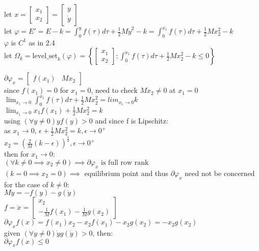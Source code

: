 \documentclass[12pt,letter]{article}
\begin{document}
\begin{itemize}
    let $x=\begin{bmatrix}x_1 \\ x_2 \end{bmatrix}=\begin{bmatrix}y \\ \dot{y} \end{bmatrix}$\\

    let $\varphi=E'=E-k=\int_{0}^y f(\tau) d \tau + \frac{1}{2}M \dot{y}^2-k=\int_{0}^{x_1} f(\tau) d \tau + \frac{1}{2}M x_2^2-k$\\

    $\varphi$ is $C^1$ as in 2.4\\
    
    let $\Omega_k = \text{level\_set}_{k}(\varphi) = \left\{\begin{bmatrix}x_1 \\ x_2\end{bmatrix}: \int_{0}^{x_1} f(\tau) d \tau + \frac{1}{2}M x_2^2-k \leq 0 \right\}$

    $\partial \varphi_x = \begin{bmatrix} f(x_1) & M x_2\end{bmatrix}$\\

    since $f(x_1)=0$  for $x_1=0$, need to check $Mx_2 \neq 0$ at $x_1=0$\\
    $\lim_{x_1\rightarrow 0} \int_{0}^{x_1} f(\tau) d \tau + \frac{1}{2}M x_2^2=lim_{x_1\rightarrow 0}k$\\
    $\lim_{x_1\rightarrow 0}x_1 f(x_1) + \frac{1}{2}M x_2^2=k$\\
    using $(\forall y \neq 0) y f(y) > 0$ and since f is Lipschitz:\\
    as $x_1 \rightarrow 0$, $\epsilon + \frac{1}{2}M x_2^2=k, \epsilon \rightarrow 0^+$\\
    $x_2=(\frac{2}{M}(k-\epsilon))^{\frac{1}{2}}, \epsilon \rightarrow 0^+$\\

    then for $x_1 \rightarrow 0$:\\
    $(\forall k\neq 0 \implies x_2 \neq 0) \implies \partial \varphi_x \text{ is full row rank}$\\
    $(k=0\implies x_2 = 0) \implies$ equilibrium point and thus $\partial \varphi_x$ need not be concerned\\

    for the case of $k\neq 0$:\\
    $M\ddot{y}=-f(y)-g(\dot{y})$\\
    $f=\dot{x}=\begin{bmatrix} x_2 \\ -\frac{1}{M}f(x_1) -\frac{1}{M}g(x_2) \end{bmatrix}$\\
    $\partial \varphi_x f(x)=f(x_1)x_2-x_2 f(x_1)-x_2 g(x_2)=-x_2 g(x_2)$\\
    given $(\forall y \neq 0)\dot{y}g(\dot{y})>0$, then:\\
    $\partial \varphi_x f(x) \leq 0$\\
    

\end{itemize}
\end{document}
